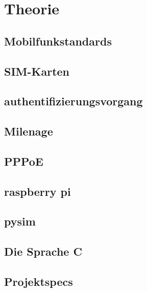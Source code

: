 \clearpage

\section{Theorie}
\label{theorie}

\subsection{Mobilfunkstandards}

\subsection{SIM-Karten}

\subsection{authentifizierungsvorgang}

\subsection{Milenage}

\subsection{PPPoE}

\subsection{raspberry pi}

\subsection{pysim}

\subsection{Die Sprache C}

\subsection{Projektspecs}
